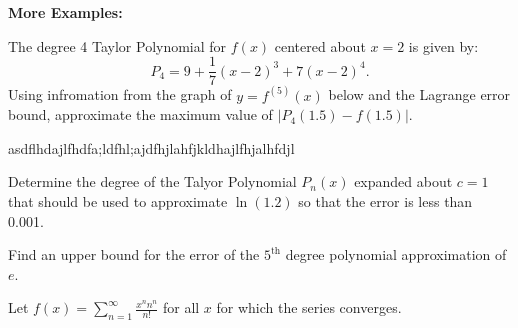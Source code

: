\documentclass[addpoints, 12pt]{exam}
\begin{document}
\noindent\textbf{More Examples:}
\begin{questions}
    \question The degree 4 Taylor Polynomial for $f(x)$ centered about $x=2$ is given by:
    \[P_4=9+\frac{1}{7}(x-2)^3+7(x-2)^4 .\]
    Using infromation from the graph of $y=f^{(5)}(x)$ below and the Lagrange error bound, approximate the maximum value of $\left|P_4(1.5)-f(1.5)\right|$.


    \question asdflhdajlfhdfa;ldfhl;ajdfhjlahfjkldhajlfhjalhfdjl


    \question Determine the degree of the Talyor Polynomial $P_n(x)$ expanded about $c=1$ that should be used to approximate $\ln(1.2)$ so that the error is less than 0.001.
    
    \question Find an upper bound for the error of the $5^{\text{th}}$ degree polynomial approximation of $e$.
    
    \question Let $\displaystyle f(x) = \sum_{n=1}^{\infty}\frac{x^n n^n}{n!}$ for all $x$ for which the series converges.

    
    \newpage
    
    

\end{questions}
\end{document}
